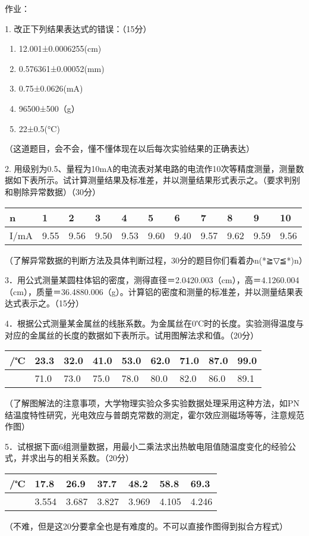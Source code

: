 \documentclass[
]{ctexart}
\author{}
\date{}
\begin{document}
作业：

1. 改正下列结果表达式的错误：（15分）

\begin{enumerate}
\def\labelenumi{(\arabic{enumi})}
\item
  12.001±0.0006255(cm)
\item
  0.576361±0.00052(mm)
\item
  0.75±0.0626(mA)
\item
  96500±500（g）
\item
  22±0.5(°C)
\end{enumerate}

（这道题目，会不会，懂不懂体现在以后每次实验结果的正确表达）

2.
用级别为0.5、量程为10mA的电流表对某电路的电流作10次等精度测量，测量数据如下表所示。试计算测量结果及标准差，并以测量结果形式表示之。（要求判别和剔除异常数据）（30分）

\begin{longtable}[]{@{}lllllllllll@{}}
\toprule
n & 1 & 2 & 3 & 4 & 5 & 6 & 7 & 8 & 9 & 10 \\
\midrule
\endhead
I/mA & 9.55 & 9.56 & 9.50 & 9.53 & 9.60 & 9.40 & 9.57 & 9.62 & 9.59 &
9.56 \\
\bottomrule
\end{longtable}

（了解异常数据的判断方法及具体判断过程，30分的题目你们看着办n(*≧▽≦*)n）

3．用公式测量某圆柱体铝的密度，测得直径＝2.0420.003（cm），高＝4.1260.004（cm），质量＝36.4880.006（g）。计算铝的密度和测量的标准差，并以测量结果表达式表示之。（15分）

4．根据公式测量某金属丝的线胀系数。为金属丝在0℃时的长度。实验测得温度与对应的金属丝的长度的数据如下表所示。试用图解法求和值。（20分）

\begin{longtable}[]{@{}lllllllll@{}}
\toprule
/℃ & 23.3 & 32.0 & 41.0 & 53.0 & 62.0 & 71.0 & 87.0 & 99.0 \\
\midrule
\endhead
& 71.0 & 73.0 & 75.0 & 78.0 & 80.0 & 82.0 & 86.0 & 89.1 \\
\bottomrule
\end{longtable}

（了解图解法的注意事项，大学物理实验众多实验数据处理采用这种方法，如PN结温度特性研究，光电效应与普朗克常数的测定，霍尔效应测磁场等等，注意规范作图）

5．试根据下面6组测量数据，用最小二乘法求出热敏电阻值随温度变化的经验公式，并求出与的相关系数。（20分）

\begin{longtable}[]{@{}lllllll@{}}
\toprule
/℃ & 17.8 & 26.9 & 37.7 & 48.2 & 58.8 & 69.3 \\
\midrule
\endhead
& 3.554 & 3.687 & 3.827 & 3.969 & 4.105 & 4.246 \\
\bottomrule
\end{longtable}

（不难，但是这20分要拿全也是有难度的。不可以直接作图得到拟合方程式）
\end{document}
